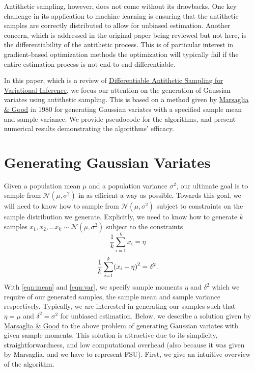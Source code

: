 \documentclass[12pt, a4paper]{article}
\DeclarePairedDelimiter \parens{(}{)}
\begin{document}
Antithetic sampling, however, does not come without its drawbacks.
One key challenge in its application to machine learning is ensuring that the antithetic samples are correctly distributed to allow for unbiased estimation.
Another concern, which is addressed in the original paper being reviewed but not here, is the differentiability of the antithetic process.
This is of particular interest in gradient-based optimization methods the optimization will typically fail if the entire estimation process is not end-to-end differentiable.

In this paper, which is a review of \href{https://arxiv.org/pdf/1810.02555.pdf}{Differentiable Antithetic Sampling for Variational Inference},
we focus our attention on the generation of Gaussian variates using antithetic sampling.
This is based on a method given by \hyperref[ref:marsaglia]{Marsaglia \& Good} in 1980 for generating Gaussian variates with a specified sample mean and sample variance.
We provide pseudocode for the algorithms, and present numerical results demonstrating the algorithms' efficacy.

\section{Generating Gaussian Variates} \label{sec:2}
Given a population mean $\mu$ and a population variance $\sigma^2$, our ultimate goal is to sample from $\mathcal{N}(\mu, \sigma^2)$ in as efficient a way as possible.
Towards this goal, we will need to know how to sample from $\mathcal{N}(\mu, \sigma^2)$ subject to constraints on the sample distribution we generate.
Explicitly, we need to know how to generate $k$ samples $x_1, x_2, \dots x_k \sim \mathcal{N}(\mu, \sigma^2)$ subject to the constraints
\begin{equation}
    \label{eqn:mean}
    \frac{1}{k}\sum_{i = 1}^{k}x_i = \eta
\end{equation}
\begin{equation}
    \label{eqn:var}
    \frac{1}{k}\sum_{i = 1}^{k}\parens*{x_i - \eta}^2 = \delta^2.
\end{equation}
With \autoref{eqn:mean} and \autoref{eqn:var}, we specify sample moments $\eta$ and $\delta^2$ which we require of our generated samples,
the sample mean and sample variance respectively.
Typically, we are interested in generating our samples such that $\eta = \mu$ and $\delta^2 = \sigma^2$ for unbiased estimation.
Below, we describe a solution given by \hyperref[ref:marsaglia]{Marsaglia \& Good} to the above problem of generating Gaussian variates with given sample moments.
This solution is attractive due to its simplicity, straightforwardness, and low computational overhead (also because it was given by Marsaglia, and we have to represent FSU).
First, we give an intuitive overview of the algorithm.
\end{document}
